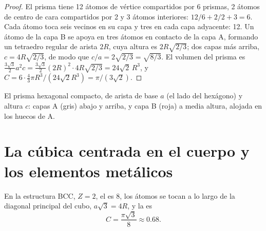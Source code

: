 \begin{proof}
El prisma tiene 12 átomos de vértice compartidos por 6 prismas, 2 átomos
de centro de cara compartidos por 2 y 3 átomos interiores:
$12/6 + 2/2 + 3 = 6$. Cada átomo toca seis vecinos en su capa y tres en
cada capa adyacente: 12. Un átomo de la capa B se apoya en tres átomos en
contacto de la capa A, formando un tetraedro regular de arista $2R$, cuya
altura es $2R\sqrt{2/3}$; dos capas más arriba, $c = 4R\sqrt{2/3}$, de
modo que $c/a = 2\sqrt{2/3} = \sqrt{8/3}$. El volumen del prisma es
$\frac{3\sqrt3}{2}a^2 c = \frac{3\sqrt3}{2}(2R)^2 \cdot
4R\sqrt{2/3} = 24\sqrt2\,R^3$, y $C = 6 \cdot \frac43\pi R^3/(24\sqrt2
R^3) = \pi/(3\sqrt2)$.
\end{proof}

\begin{omfigure}

{\small El prisma hexagonal compacto, de arista de base $a$ (el lado del
hexágono) y altura $c$: capas A (gris) abajo y arriba, y capa B (roja) a
media altura, alojada en los huecos de A.}
\end{omfigure}

\section{La cúbica centrada en el cuerpo y los elementos metálicos}

\begin{proposition}\label{prop:b1:crystals-metals:bcc}
En la estructura BCC, $Z = 2$, el  es 8, los átomos
se tocan a lo largo de la diagonal principal del cubo, $a\sqrt3 = 4R$, y
la  es
\[
  C = \frac{\pi\sqrt3}{8} \approx 0.68 .
\]
\end{proposition}

